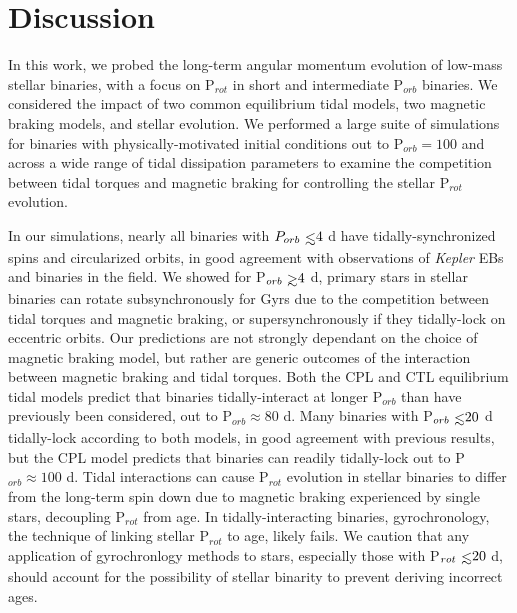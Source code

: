 \documentclass[twocolumn]{aastex61}
\def\gsim{~\rlap{$>$}{\lower 1.0ex\hbox{$\sim$}}}
\def\lsim{~\rlap{$<$}{\lower 1.0ex\hbox{$\sim$}}}
\newcommand{\kepler}[0]{\textit{Kepler}\xspace}
\begin{document}
\section{Discussion} \label{sec:discussion}

In this work, we probed the long-term angular momentum evolution of low-mass stellar binaries, with a focus on P$_{rot}$ in short and intermediate P$_{orb}$ binaries.  We considered the impact of two common equilibrium tidal models, two magnetic braking models, and stellar evolution.  We performed a large suite of simulations for binaries with physically-motivated initial conditions out to P$_{orb} = 100$ and across a wide range of tidal dissipation parameters to examine the competition between tidal torques and magnetic braking for controlling the stellar P$_{rot}$ evolution. 

In our simulations, nearly all binaries with $P_{orb} \lsim 4$ d have tidally-synchronized spins and circularized orbits, in good agreement with observations of \kepler EBs and binaries in the field. We showed for P$_{orb} \gsim 4$ d, primary stars in stellar binaries can rotate subsynchronously for Gyrs due to the competition between tidal torques and magnetic braking, or supersynchronously if they tidally-lock on eccentric orbits. Our predictions are not strongly dependant on the choice of magnetic braking model, but rather are generic outcomes of the interaction between magnetic braking and tidal torques.  Both the CPL and CTL equilibrium tidal models predict that binaries tidally-interact at longer P$_{orb}$ than have previously been considered, out to P$_{orb} \approx 80$ d. Many binaries with P$_{orb} \lsim 20$ d tidally-lock according to both models, in good agreement with previous results, but the CPL model predicts that binaries can readily tidally-lock out to P$_{orb} \approx 100$ d. Tidal interactions can cause P$_{rot}$ evolution in stellar binaries to differ from the long-term spin down due to magnetic braking experienced by single stars, decoupling P$_{rot}$ from age.  In tidally-interacting binaries, gyrochronology, the technique of linking stellar P$_{rot}$ to age, likely fails. We caution that any application of gyrochronlogy methods to stars, especially those with P$_{rot} \lsim 20$ d, should account for the possibility of stellar binarity to prevent deriving incorrect ages.  
\end{document}
